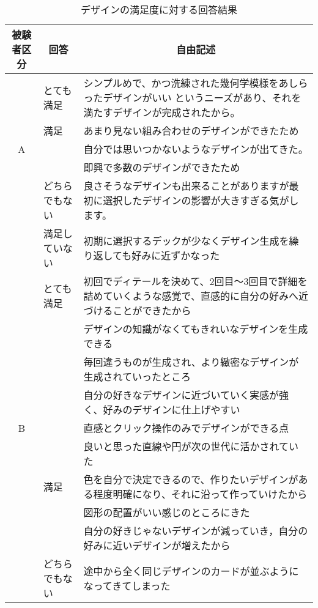 \begin{table}[htbp]
    \centering    \caption{デザインの満足度に対する回答結果}
    \begin{tabular}{|c|p{7em}|p{26em}|} \hline
        被験者区分 & \multicolumn{1}{|c|}{回答} & \multicolumn{1}{|c|}{自由記述} \\ \hline
         & とても満足 & シンプルめで、かつ洗練された幾何学模様をあしらったデザインがいい というニーズがあり、それを満たすデザインが完成されたから。\\ \cline{2-3}
          &  満足& あまり見ない組み合わせのデザインができたため \\\cline{3-3}
        A  & & 自分では思いつかないようなデザインが出てきた。\\\cline{3-3}
          & & 即興で多数のデザインができたため \\ \cline{2-3}
          & どちらでもない & 良さそうなデザインも出来ることがありますが最初に選択したデザインの影響が大きすぎる気がします。\\ \cline{2-3}
          & 満足していない& 初期に選択するデックが少なくデザイン生成を繰り返しても好みに近ずかなった \\ \hline
        & とても満足 & 初回でディテールを決めて、2回目〜3回目で詳細を詰めていくような感覚で、直感的に自分の好みへ近づけることができたから \\\cline{3-3}
         & &   デザインの知識がなくてもきれいなデザインを生成できる \\\cline{3-3}
         & & 毎回違うものが生成され、より緻密なデザインが生成されていったところ \\\cline{3-3}
         & & 自分の好きなデザインに近づいていく実感が強く、好みのデザインに仕上げやすい\\\cline{3-3}
        B & & 直感とクリック操作のみでデザインができる点 \\\cline{3-3}
         & &良いと思った直線や円が次の世代に活かされていた\\\cline{2-3}
         & 満足& 色を自分で決定できるので、作りたいデザインがある程度明確になり、それに沿って作っていけたから \\\cline{3-3}
         &  &図形の配置がいい感じのところにきた\\\cline{3-3}
         & &自分の好きじゃないデザインが減っていき，自分の好みに近いデザインが増えたから \\ \cline{2-3}
         & どちらでもない&途中から全く同じデザインのカードが並ぶようになってきてしまった　\\ \hline

    \end{tabular}
    \label{free}
\end{table}

